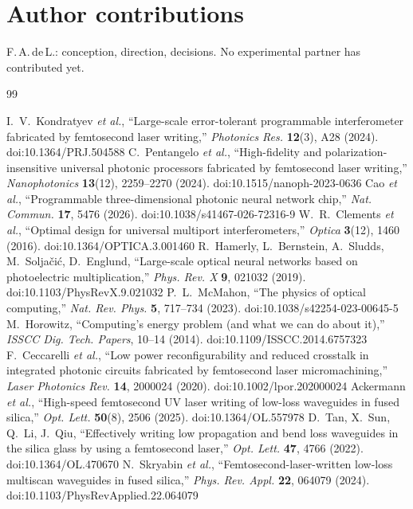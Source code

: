 \documentclass[10pt,a4paper]{article}
\begin{document}
\section*{Author contributions}
F.\,A.\,de\,L.: conception, direction, decisions. No experimental partner has contributed yet.


\begin{thebibliography}{99}

 I.~V.~Kondratyev \emph{et al.}, ``Large-scale error-tolerant programmable interferometer fabricated by femtosecond laser writing,'' \emph{Photonics Res.} \textbf{12}(3), A28 (2024). doi:10.1364/PRJ.504588
 C.~Pentangelo \emph{et al.}, ``High-fidelity and polarization-insensitive universal photonic processors fabricated by femtosecond laser writing,'' \emph{Nanophotonics} \textbf{13}(12), 2259--2270 (2024). doi:10.1515/nanoph-2023-0636
 Cao \emph{et al.}, ``Programmable three-dimensional photonic neural network chip,'' \emph{Nat. Commun.} \textbf{17}, 5476 (2026). doi:10.1038/s41467-026-72316-9
 W.~R.~Clements \emph{et al.}, ``Optimal design for universal multiport interferometers,'' \emph{Optica} \textbf{3}(12), 1460 (2016). doi:10.1364/OPTICA.3.001460
 R.~Hamerly, L.~Bernstein, A.~Sludds, M.~Solja\v{c}i\'c, D.~Englund, ``Large-scale optical neural networks based on photoelectric multiplication,'' \emph{Phys. Rev. X} \textbf{9}, 021032 (2019). doi:10.1103/PhysRevX.9.021032
 P.~L.~McMahon, ``The physics of optical computing,'' \emph{Nat. Rev. Phys.} \textbf{5}, 717--734 (2023). doi:10.1038/s42254-023-00645-5
 M.~Horowitz, ``Computing's energy problem (and what we can do about it),'' \emph{ISSCC Dig. Tech. Papers}, 10--14 (2014). doi:10.1109/ISSCC.2014.6757323
 F.~Ceccarelli \emph{et al.}, ``Low power reconfigurability and reduced crosstalk in integrated photonic circuits fabricated by femtosecond laser micromachining,'' \emph{Laser Photonics Rev.} \textbf{14}, 2000024 (2020). doi:10.1002/lpor.202000024
 Ackermann \emph{et al.}, ``High-speed femtosecond UV laser writing of low-loss waveguides in fused silica,'' \emph{Opt. Lett.} \textbf{50}(8), 2506 (2025). doi:10.1364/OL.557978
 D.~Tan, X.~Sun, Q.~Li, J.~Qiu, ``Effectively writing low propagation and bend loss waveguides in the silica glass by using a femtosecond laser,'' \emph{Opt. Lett.} \textbf{47}, 4766 (2022). doi:10.1364/OL.470670
 N.~Skryabin \emph{et al.}, ``Femtosecond-laser-written low-loss multiscan waveguides in fused silica,'' \emph{Phys. Rev. Appl.} \textbf{22}, 064079 (2024). doi:10.1103/PhysRevApplied.22.064079

\end{thebibliography}
\end{document}
